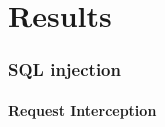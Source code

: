 \chapter{Results}\label{chap:results}

\subsection{SQL injection}
\subsubsection{Request Interception}
